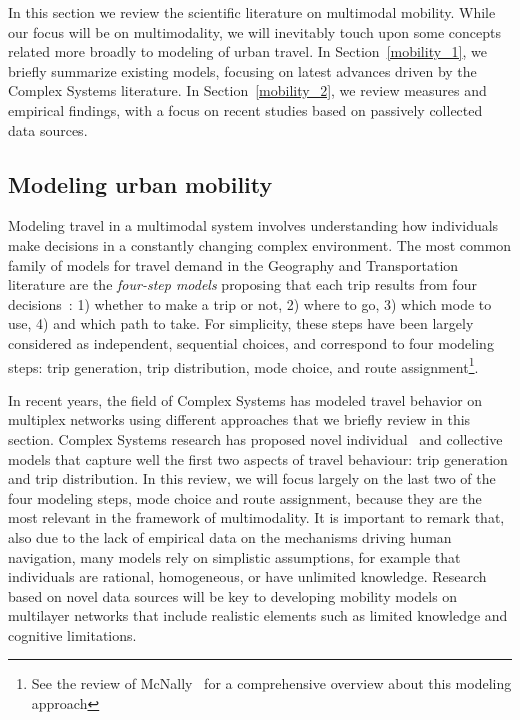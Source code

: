 In this section we review the scientific literature on multimodal mobility. While our focus will be on multimodality, we will inevitably touch upon some concepts related more broadly to modeling of urban travel. In Section~\ref{mobility_1}, we briefly summarize existing models, focusing on latest advances driven by the Complex Systems literature. In Section~\ref{mobility_2}, we review measures and empirical findings, with a focus on recent studies based on passively collected data sources. 

\subsection{Modeling urban mobility \label{mobility_1}}

Modeling travel in a multimodal system involves understanding how individuals make decisions in a constantly changing complex environment. The most common family of models for travel demand in the Geography and Transportation literature are the \emph{four-step models} proposing that each trip results from four decisions~\cite{mcnally2000four}: 1) whether to make a trip or not, 2) where to go, 3) which mode to use, 4) and which path to take. For simplicity, these steps have been largely considered as independent, sequential choices, and correspond to four modeling steps: trip generation, trip distribution, mode choice, and route assignment\footnote{See the review of McNally~\cite{mcnally2000four} for a comprehensive overview about this modeling approach}.

In recent years, the field of Complex Systems has modeled travel behavior on multiplex networks using different approaches that we briefly review in this section. Complex Systems research has proposed novel individual~\cite{song2010modelling,jiang2016timegeo,alessandretti2020scales} and collective~\cite{simini2012universal,schlapfer2020hidden} models that capture well the first two aspects of travel behaviour: trip generation and trip distribution. In this review, we will focus largely on the last two of the four modeling steps, mode choice and route assignment, because they are the most relevant in the framework of multimodality. It is important to remark that, also due to the lack of empirical data on the mechanisms driving human navigation, many models rely on simplistic assumptions, for example that individuals are rational, homogeneous, or have unlimited knowledge. Research based on novel data sources will be key to developing mobility models on multilayer networks that include realistic elements such as limited knowledge and cognitive limitations.


